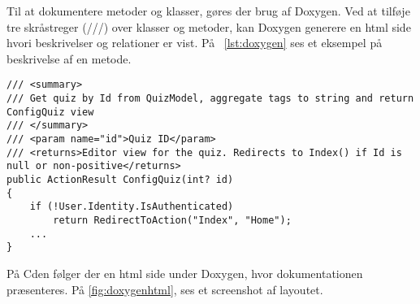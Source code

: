 Til at dokumentere metoder og klasser, gøres der brug af Doxygen. Ved at tilføje tre skråstreger (///) over klasser og metoder, kan Doxygen generere en html side hvori beskrivelser og relationer er vist.
På \lstlistingname\ \ref{lst:doxygen} ses et eksempel på beskrivelse af en metode.

\begin{lstlisting}[caption=Eksempel på Doxygen notation, label=lst:doxygen]
/// <summary>
/// Get quiz by Id from QuizModel, aggregate tags to string and return ConfigQuiz view
/// </summary>
/// <param name="id">Quiz ID</param>
/// <returns>Editor view for the quiz. Redirects to Index() if Id is null or non-positive</returns>
public ActionResult ConfigQuiz(int? id)
{
	if (!User.Identity.IsAuthenticated)
		return RedirectToAction("Index", "Home");
	...
}
\end{lstlisting}

På Cden følger der en html side under Doxygen, hvor dokumentationen præsenteres. På \ref{fig:doxygenhtml}, ses et screenshot af layoutet.

